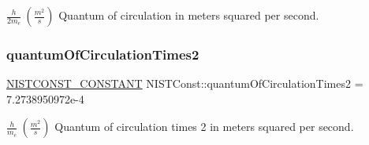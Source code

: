 $\frac{h}{2 m_e} \ (\frac{m^2}{s})$ Quantum of circulation in meters squared per second. \mbox{\label{group___n_i_s_t_const-_quantum_of_circulation_ga4d7993b701441cde35cd27b7175874c3}} 
\subsubsection{\texorpdfstring{quantum\+Of\+Circulation\+Times2}{quantumOfCirculationTimes2}}
{\footnotesize\ttfamily \mbox{\hyperlink{_n_i_s_t_const_8hpp_a2b0fc1d7452373f816175dd86ce26729}{N\+I\+S\+T\+C\+O\+N\+S\+T\+\_\+\+C\+O\+N\+S\+T\+A\+NT}} N\+I\+S\+T\+Const\+::quantum\+Of\+Circulation\+Times2 = 7.\+2738950972e-\/4}

$\frac{h}{m_e} \ (\frac{m^2}{s})$ Quantum of circulation times 2 in meters squared per second. 